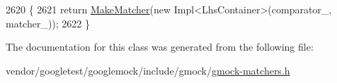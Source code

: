 \begin{DoxyCode}
2620                                          \{
2621     \textcolor{keywordflow}{return} \hyperlink{namespacetesting_a37fd8029ac00e60952440a3d9cca8166}{MakeMatcher}(\textcolor{keyword}{new} Impl<LhsContainer>(comparator\_, matcher\_));
2622   \}
\end{DoxyCode}


The documentation for this class was generated from the following file\+:\begin{DoxyCompactItemize}
\item 
vendor/googletest/googlemock/include/gmock/\hyperlink{gmock-matchers_8h}{gmock-\/matchers.\+h}\end{DoxyCompactItemize}
